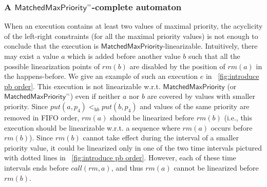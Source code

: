 \subsubsection{A $\mathsf{MatchedMaxPriority}^=$-complete automaton}
\label{subsec:co-regular of EPQ1Equal}

When an execution contains at least two values of maximal priority, the acyclicity of the left-right constraints (for all the maximal priority values) is not enough to conclude that the execution is $\mathsf{MatchedMaxPriority}$-linearizable.
Intuitively, there may exist a value $a$ which is added before another value $b$ such that all the possible linearization points of $\textit{rm}(b)$ are disabled by the position of $\textit{rm}(a)$ in the happens-before. We give an example of such an execution $e$ in \figurename~\ref{fig:introduce pb order}. This execution  is not linearizable w.r.t. $\mathsf{MatchedMaxPriority}$ (or $\mathsf{MatchedMaxPriority}^{=}$) even if
neither $a$ nor $b$ are covered by values with smaller priority. %
Since $\textit{put}(a,p_4) <_{\textit{hb}} \textit{put}(b,p_4)$ and values of the same priority are removed in FIFO order, $\textit{rm}(a)$ should be linearized before $\textit{rm}(b)$ (i.e., this execution should be linearizable w.r.t. a sequence where $\textit{rm}(a)$ occurs before $\textit{rm}(b)$).
Since $\textit{rm}(b)$ cannot take effect during the interval of a smaller priority value, it could be linearized only in one of the two time intervals pictured with dotted lines in \figurename~\ref{fig:introduce pb order}. However, each of these time intervals ends before $\textit{call}(\textit{rm},a)$, and thus $\textit{rm}(a)$ cannot be linearized before $\textit{rm}(b)$.


